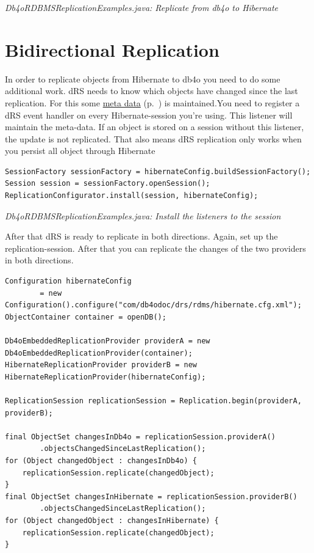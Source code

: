 {\small\itshape Db4oRDBMSReplicationExamples.java: Replicate from db4o to Hibernate\par}
\medskip

\section{Bidirectional Replication}
\label{drs:db4o-replication-system-drs-db4o-rdbms-bi-directional}

In order to replicate objects from Hibernate to db4o you need to do some additional work. dRS needs to know which objects have changed since the last replication. For this some \hyperref[drs:db4o-replication-system-drs-db4o-rdbms-drs-internals]{meta data} (p.~\pageref{drs:db4o-replication-system-drs-db4o-rdbms-drs-internals}) is maintained.You need to register a dRS event handler on every Hibernate-session you're using. This listener will maintain the meta-data. If an object is stored on a session without this listener, the update is not replicated. That also means dRS replication only works when you persist all object through Hibernate

\begin{lstlisting}
SessionFactory sessionFactory = hibernateConfig.buildSessionFactory();
Session session = sessionFactory.openSession();
ReplicationConfigurator.install(session, hibernateConfig);
\end{lstlisting}

{\small\itshape Db4oRDBMSReplicationExamples.java: Install the listeners to the session\par}
\medskip

After that dRS is ready to replicate in both directions. Again, set up the replication-session. After that you can replicate the changes of the two providers in both directions.

\begin{lstlisting}
Configuration hibernateConfig
        = new Configuration().configure("com/db4odoc/drs/rdms/hibernate.cfg.xml");
ObjectContainer container = openDB();

Db4oEmbeddedReplicationProvider providerA = new Db4oEmbeddedReplicationProvider(container);
HibernateReplicationProvider providerB = new HibernateReplicationProvider(hibernateConfig);

ReplicationSession replicationSession = Replication.begin(providerA, providerB);

final ObjectSet changesInDb4o = replicationSession.providerA()
        .objectsChangedSinceLastReplication();
for (Object changedObject : changesInDb4o) {
    replicationSession.replicate(changedObject);
}
final ObjectSet changesInHibernate = replicationSession.providerB()
        .objectsChangedSinceLastReplication();
for (Object changedObject : changesInHibernate) {
    replicationSession.replicate(changedObject);
}
\end{lstlisting}

